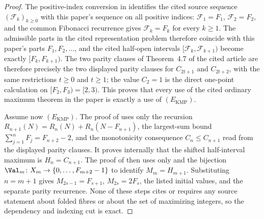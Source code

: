 \begin{proof}
The positive-index conversion in
 identifies the cited source
sequence \((\mathcal F_k)_{k\ge0}\) with this paper's sequence on all positive
indices: \(\mathcal F_1=F_1\), \(\mathcal F_2=F_2\), and the common Fibonacci
recurrence gives \(\mathcal F_k=F_k\) for every \(k\ge1\).  The admissible parts in
the cited representation problem therefore coincide with this paper's parts
\(F_1,F_2,\ldots\), and the cited half-open intervals
\([\mathcal F_k,\mathcal F_{k+1})\) become exactly \([F_k,F_{k+1})\).  The two
parity clauses of Theorem~4.7 of the cited article are therefore precisely the
two displayed parity clauses for \(C_{2t+1}\) and \(C_{2t+2}\), with the same
restrictions \(t\ge0\) and \(t\ge1\); the value \(C_2=1\) is the direct one-point
calculation on \([F_2,F_3)=[2,3)\).  This proves that every use of the cited
ordinary maximum theorem in the paper is exactly a use of
\((E_{\mathrm{KMP}})\).

Assume now \((E_{\mathrm{KMP}})\).  The proof of
 uses only the recursion
\(R_{n+1}(N)=R_n(N)+R_n(N-F_{n+1})\), the largest-sum bound
\(\sum_{j=1}^nF_j=F_{n+2}-2\), and the monotonicity consequence
\(C_n\le C_{n+1}\) read from the displayed parity clauses.  It proves internally
that the shifted half-interval maximum is \(H_n=C_{n+1}\).  The proof of
 then uses only
 and the bijection
\(\Val_m\colon X_m\to\{0,\ldots,F_{m+2}-1\}\) to identify \(M_m=H_{m+1}\).
Substituting \(n=m+1\) gives \(M_{2s-1}=F_{s+1}\), \(M_{2s}=2F_s\), the listed
initial values, and the separate parity recurrence.  None of these steps cites or
requires any source statement about folded fibres or about the set of maximizing
integers, so the dependency and indexing cut is exact.
\end{proof}

